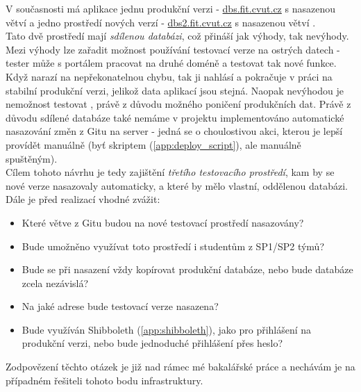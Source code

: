 V současnosti má aplikace jednu produkční verzi - \url{dbs.fit.cvut.cz} s nasazenou větví  a jedno  prostředí nových verzí - \url{dbs2.fit.cvut.cz} s nasazenou větví .\\
Tato dvě prostředí mají \emph{sdílenou databázi}, což přináší jak výhody, tak nevýhody. Mezi výhody lze zařadit možnost používání testovací verze na ostrých datech - tester může s portálem pracovat na druhé doméně a testovat tak nové funkce. Když narazí na nepřekonatelnou chybu, tak ji nahlásí a pokračuje v práci na stabilní produkční verzi, jelikož data aplikací jsou stejná. Naopak nevýhodou je nemožnost testovat , právě z důvodu možného poničení produkčních dat. Právě z důvodu sdílené databáze také nemáme v projektu implementováno automatické nasazování změn z Gitu na server - jedná se o choulostivou akci, kterou je lepší provídět manuálně (byť skriptem (\ref{app:deploy_script}), ale manuálně spuštěným).\\
Cílem tohoto návrhu je tedy zajištění \emph{třetího testovacího prostředí}, kam by se nové verze nasazovaly automaticky, a které by mělo vlastní, oddělenou databázi. Dále je před realizací vhodné zvážit:
\begin{itemize}
	\item Které větve z Gitu budou na nové testovací prostředí nasazovány?
	\item Bude umožněno využívat toto prostředí i studentům z SP1/SP2 týmů?
	\item Bude se při nasazení vždy kopírovat produkční databáze, nebo bude databáze zcela nezávislá?
	\item Na jaké adrese bude testovací verze nasazena?
	\item Bude využíván Shibboleth (\ref{app:shibboleth}), jako pro přihlášení na produkční verzi, nebo bude jednoduché přihlášení přes heslo?
\end{itemize}
Zodpovězení těchto otázek je již nad rámec mé bakalářské práce a nechávám je na případném řešiteli tohoto bodu infrastruktury.
